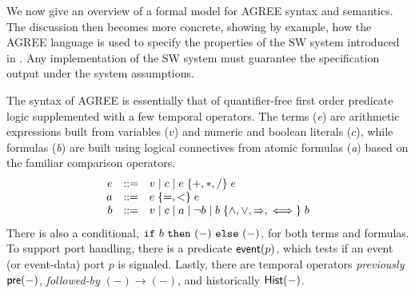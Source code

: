 \begin{comment}
This section gives an abstract mathematical overview of AGREE's
compositional reasoning system, defining assume-guarantee contracts
and the verification conditions that AGREE checks in order to
modularly establish overall system correctness at the model level.
The syntax and semantics of AGREE are sketched in some detail.  The
discussion then becomes more concrete, showing---by example---how the
AGREE contract language is used to specify the cyber-hardened system
of \figref{fig:hardened}. The discussion proceeds from the
system-level contract to the filter and monitor components, which rely
on the notion of a \emph{code contract} to support code generation.
\end{comment}

We now give an overview of a formal model for AGREE syntax and
semantics.  The discussion then becomes more concrete, showing by
example, how the AGREE language is used to specify the properties of
the SW system introduced in .  Any implementation
of the SW system must guarantee the specification output under the
system assumptions.

The syntax of AGREE is essentially that of quantifier-free first order
predicate logic supplemented with a few temporal operators. The terms
(\emph{e}) are arithmetic expressions built from variables ($v$) and
numeric and boolean literals ($c$), while formulas (\emph{b}) are
built using logical connectives from atomic formulas (\emph{a}) based
on the familiar comparison operators.
\[
\begin{array}{rcl}
e & ::= & v \mid c \mid e \;\{ {+,*,/} \}\; e \\
a & ::= & e\; \{ {=,<} \}\; e \\
b & ::= & v \mid c \mid a \mid \neg b
            \mid b \; \{ {\land,\lor,\Rightarrow,\iff} \}\; b
\end{array}
\]
There is also a conditional, $\mbox{$\mathtt{if}\ {b}\ \mathtt{then}\ {(-)}\ \mathtt{else}\ {(-)}$}$, for both terms
and formulas. To support port handling, there is a predicate
$\mathsf{event}(p)$, which tests if an event (or event-data) port $p$ is
signaled. Lastly, there are temporal operators \emph{previously}
$\mathsf{pre}(-)$, \emph{followed-by} $(-) \to (-)$, and historically
$\mathsf{Hist}(-)$.

